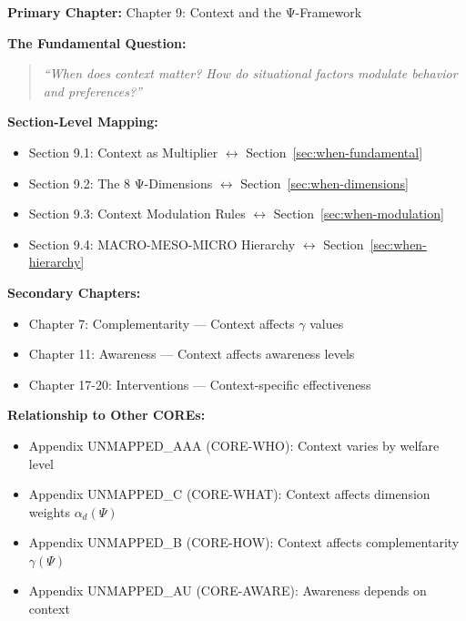 
\begin{tcolorbox}[colback=purple!5!white, colframe=purple!75!black,
    title=Chapter Linkage]

\textbf{Primary Chapter:} Chapter 9: Context and the Ψ-Framework

\vspace{0.3em}
\textbf{The Fundamental Question:}
\begin{quote}
\textit{``When does context matter? How do situational factors modulate behavior and preferences?''}
\end{quote}

\textbf{Section-Level Mapping:}
\begin{itemize}[nosep]
\item Section 9.1: Context as Multiplier $\leftrightarrow$ Section~\ref{sec:when-fundamental}
\item Section 9.2: The 8 Ψ-Dimensions $\leftrightarrow$ Section~\ref{sec:when-dimensions}
\item Section 9.3: Context Modulation Rules $\leftrightarrow$ Section~\ref{sec:when-modulation}
\item Section 9.4: MACRO-MESO-MICRO Hierarchy $\leftrightarrow$ Section~\ref{sec:when-hierarchy}
\end{itemize}

\textbf{Secondary Chapters:}
\begin{itemize}[nosep]
\item Chapter 7: Complementarity --- Context affects $\gamma$ values
\item Chapter 11: Awareness --- Context affects awareness levels
\item Chapter 17-20: Interventions --- Context-specific effectiveness
\end{itemize}

\textbf{Relationship to Other COREs:}
\begin{itemize}[nosep]
\item Appendix UNMAPPED_AAA (CORE-WHO): Context varies by welfare level
\item Appendix UNMAPPED_C (CORE-WHAT): Context affects dimension weights $\alpha_d(\Psi)$
\item Appendix UNMAPPED_B (CORE-HOW): Context affects complementarity $\gamma(\Psi)$
\item Appendix UNMAPPED_AU (CORE-AWARE): Awareness depends on context
\end{itemize}

\end{tcolorbox}

